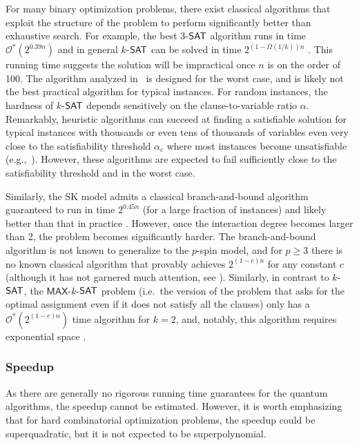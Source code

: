 \begin{refsection}
For many binary optimization problems, there exist classical algorithms that exploit the structure of the problem to perform significantly better than exhaustive search. For example, the best 3-$\mathsf{SAT}$ algorithm runs in time $\mathcal{O}^*(2^{0.39n})$ and in general $k$-$\mathsf{SAT}$ can be solved in time $2^{(1-\Omega(1/k))n}$ \cite{dueholm2019fasterKSAT}. This running time suggests the solution will be impractical once $n$ is on the order of 100. The algorithm analyzed in~\cite{dueholm2019fasterKSAT} is designed for the worst case, and is likely not the best practical algorithm for typical instances. For random instances, the hardness of $k$-$\mathsf{SAT}$ depends sensitively on the clause-to-variable ratio $\alpha$. Remarkably, heuristic algorithms can succeed at finding a satisfiable solution for typical instances with thousands or even tens of thousands of variables even very close to the satisfiability threshold $\alpha_c$ where most instances become unsatisfiable (e.g.,~\cite{marino2016backtracking}). However, these algorithms are expected to fail sufficiently close to the satisfiability threshold and in the worst case. 

Similarly, the SK model admits a classical branch-and-bound algorithm guaranteed to run in time $2^{0.45n}$ (for a large fraction of instances) and likely better than that in practice \cite{montanaro2019QBranchAndBound}. However, once the interaction degree becomes larger than 2, the problem becomes significantly harder. The branch-and-bound algorithm is not known to generalize to the $p$-spin model, and for $p \geq 3$ there is no known classical algorithm that provably achieves $2^{(1-c)n}$ for any constant $c$ (although it has not garnered much attention, see \cite{dalzell2022mindthegap}). Similarly, in contrast to $k$-$\mathsf{SAT}$, the $\mathsf{MAX}$-$k$-$\mathsf{SAT}$ problem (i.e.~the version of the problem that asks for the optimal assignment even if it does not satisfy all the clauses) only has a $\mathcal{O}^*(2^{(1-c)n})$ time algorithm for $k=2$, and, notably, this algorithm requires exponential space \cite{williams2005algorithm2CSP}.


\subsubsection*{Speedup}

As there are generally no rigorous running time guarantees for the quantum algorithms, the speedup cannot be estimated. However, it is worth emphasizing that for hard combinatorial optimization problems, the speedup could be superquadratic, but it is not expected to be superpolynomial.  


\end{refsection}
